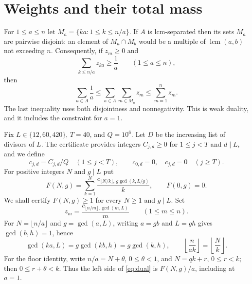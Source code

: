 \documentclass[10pt]{article}
\theoremstyle{remark}
\newcommand{\lcm}{\operatorname{lcm}}
\begin{document}
\section{Weights and their total mass}\label{sec:weights}
For $1\le a\le n$ let $M_a=\{ka:1\le k\le n/a\}$. If $A$ is
lcm-separated then its sets $M_a$ are pairwise disjoint: an element of
$M_a\cap M_b$ would be a multiple of $\lcm(a,b)$ not exceeding $n$.
Consequently, if $z_m\ge0$ and
\begin{equation}\label{eq:dual}
 \sum_{k\le n/a}z_{ka}\ge\frac1a\qquad(1\le a\le n),
\end{equation}
then
\[
 \sum_{a\in A}\frac1a
 \le\sum_{a\in A}\sum_{m\in M_a}z_m
 \le\sum_{m=1}^n z_m.
\]
The last inequality uses both disjointness and nonnegativity. This is
weak duality, and it includes the constraint for $a=1$.

Fix $L\in\{12,60,420\}$, $T=40$, and $Q=10^6$. Let $D$ be the
increasing list of divisors of $L$. The certificate provides integers
$C_{j,d}\ge0$ for $1\le j<T$ and $d\mid L$, and we define
\[
 c_{j,d}=C_{j,d}/Q\quad(1\le j<T),\qquad
 c_{0,d}=0,\quad c_{j,d}=0\quad(j\ge T).
\]
For positive integers $N$ and $g\mid L$ put
\begin{equation}\label{eq:F}
 F(N,g)=\sum_{k=1}^N\frac{c_{\lfloor N/k\rfloor,\,g\gcd(k,L/g)}}{k},
 \qquad F(0,g)=0.
\end{equation}
We shall certify $F(N,g)\ge1$ for every $N\ge1$ and $g\mid L$.
Set
\begin{equation}\label{eq:z}
 z_m=\frac{c_{\lfloor n/m\rfloor,\gcd(m,L)}}m\qquad(1\le m\le n).
\end{equation}
For $N=\lfloor n/a\rfloor$ and $g=\gcd(a,L)$, writing $a=gb$ and
$L=gh$ gives $\gcd(b,h)=1$, hence
\[
 \gcd(ka,L)=g\gcd(kb,h)=g\gcd(k,h),\qquad
 \left\lfloor\frac{n}{ak}\right\rfloor=\left\lfloor\frac Nk\right\rfloor.
\]
For the floor identity, write $n/a=N+\theta$, $0\le\theta<1$, and
$N=qk+r$, $0\le r<k$; then $0\le r+\theta<k$.
Thus the left side of \eqref{eq:dual} is $F(N,g)/a$, including at $a=1$.
\end{document}
